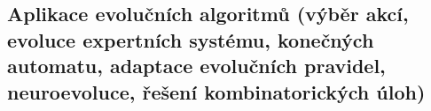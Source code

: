 \subsection{Aplikace evolučních algoritmů (výběr akcí, evoluce expertních systému, konečných automatu, adaptace evolučních pravidel, neuroevoluce, řešení kombinatorických úloh)}